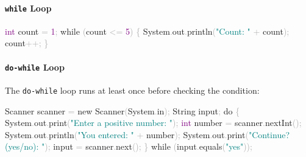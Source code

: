 \documentclass[
  justified,
  openright,
]{tufte-book}
\let\subsubsection\paragraph
\let\paragraph\paragraph
\newcommand{\BuiltInTok}[1]{#1}
\newcommand{\ControlFlowTok}[1]{\textcolor{BrandBlue}{#1}}
\newcommand{\DataTypeTok}[1]{\textcolor{Purple}{#1}}
\newcommand{\DecValTok}[1]{\textcolor{Purple}{#1}}
\newcommand{\FunctionTok}[1]{\textcolor{BrandBlue}{#1}}
\newcommand{\KeywordTok}[1]{\textcolor{BrandBlue}{#1}}
\newcommand{\NormalTok}[1]{#1}
\newcommand{\OperatorTok}[1]{\textcolor{DarkGray}{#1}}
\newcommand{\StringTok}[1]{\textcolor{Teal}{#1}}
\newenvironment{Shaded}{%
  \begin{snugshade}
}{%
  \end{snugshade}
}
\let\subsubsection\paragraph
\let\paragraph\paragraph
\begin{document}
\subsubsection{\texorpdfstring{\texttt{while}
Loop}{while Loop}}\label{while-loop}

\begin{Shaded}
\begin{Highlighting}[]
\DataTypeTok{int}\NormalTok{ count }\OperatorTok{=} \DecValTok{1}\OperatorTok{;}
\ControlFlowTok{while} \OperatorTok{(}\NormalTok{count }\OperatorTok{\textless{}=} \DecValTok{5}\OperatorTok{)} \OperatorTok{\{}
    \BuiltInTok{System}\OperatorTok{.}\FunctionTok{out}\OperatorTok{.}\FunctionTok{println}\OperatorTok{(}\StringTok{"Count: "} \OperatorTok{+}\NormalTok{ count}\OperatorTok{);}
\NormalTok{    count}\OperatorTok{++;}
\OperatorTok{\}}
\end{Highlighting}
\end{Shaded}

\subsubsection{\texorpdfstring{\texttt{do-while}
Loop}{do-while Loop}}\label{do-while-loop}

The \texttt{do-while} loop runs at least once before checking the
condition:

\begin{Shaded}
\begin{Highlighting}[]
\BuiltInTok{Scanner}\NormalTok{ scanner }\OperatorTok{=} \KeywordTok{new} \BuiltInTok{Scanner}\OperatorTok{(}\BuiltInTok{System}\OperatorTok{.}\FunctionTok{in}\OperatorTok{);}
\BuiltInTok{String}\NormalTok{ input}\OperatorTok{;}
\ControlFlowTok{do} \OperatorTok{\{}
    \BuiltInTok{System}\OperatorTok{.}\FunctionTok{out}\OperatorTok{.}\FunctionTok{print}\OperatorTok{(}\StringTok{"Enter a positive number: "}\OperatorTok{);}
    \DataTypeTok{int}\NormalTok{ number }\OperatorTok{=}\NormalTok{ scanner}\OperatorTok{.}\FunctionTok{nextInt}\OperatorTok{();}
    \BuiltInTok{System}\OperatorTok{.}\FunctionTok{out}\OperatorTok{.}\FunctionTok{println}\OperatorTok{(}\StringTok{"You entered: "} \OperatorTok{+}\NormalTok{ number}\OperatorTok{);}
    \BuiltInTok{System}\OperatorTok{.}\FunctionTok{out}\OperatorTok{.}\FunctionTok{print}\OperatorTok{(}\StringTok{"Continue? (yes/no): "}\OperatorTok{);}
\NormalTok{    input }\OperatorTok{=}\NormalTok{ scanner}\OperatorTok{.}\FunctionTok{next}\OperatorTok{();}
\OperatorTok{\}} \ControlFlowTok{while} \OperatorTok{(}\NormalTok{input}\OperatorTok{.}\FunctionTok{equals}\OperatorTok{(}\StringTok{"yes"}\OperatorTok{));}
\end{Highlighting}
\end{Shaded}
\end{document}
